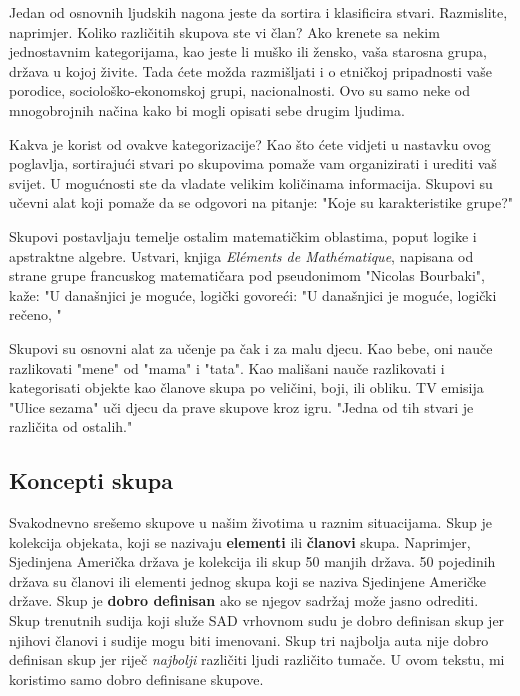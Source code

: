 \documentclass[a4paper,14pt,svgnames]{article}
\begin{document}
\bigskip\bigskip
\begin{Large}
Jedan od osnovnih ljudskih nagona jeste da sortira i klasificira stvari. Razmislite, naprimjer. Koliko različitih skupova ste vi član? Ako krenete sa nekim jednostavnim kategorijama, kao jeste li muško ili žensko, vaša starosna grupa, država u kojoj živite. Tada ćete možda razmišljati i o etničkoj pripadnosti vaše porodice, sociološko-ekonomskoj grupi, nacionalnosti. Ovo su samo neke od mnogobrojnih načina kako bi mogli opisati sebe drugim ljudima.

Kakva je korist od ovakve kategorizacije? Kao što ćete vidjeti u nastavku ovog poglavlja, sortirajući stvari po skupovima pomaže vam organizirati i urediti vaš svijet. U mogućnosti ste da vladate velikim količinama informacija. Skupovi su učevni alat koji pomaže da se odgovori na pitanje: "Koje su karakteristike grupe?"

Skupovi postavljaju temelje ostalim matematičkim oblastima, poput logike i apstraktne algebre. Ustvari, knjiga \textit{El\' ements de Math\' ematique}, napisana od strane grupe francuskog matematičara pod pseudonimom "Nicolas Bourbaki", kaže: "U današnjici je moguće, logički govoreći: "U današnjici je moguće, logički rečeno, "
\bigskip
\begin{tcolorbox}
Skupovi su osnovni alat za učenje pa čak i za malu djecu. Kao bebe, oni nauče razlikovati "mene" od "mama" i "tata". Kao mališani nauče razlikovati i kategorisati objekte kao članove skupa po veličini, boji, ili obliku. TV emisija "Ulice sezama" uči djecu da prave skupove kroz igru. "Jedna od tih stvari je različita od ostalih."
\end{tcolorbox}
\end{Large}
\newpage

\subsection{Koncepti skupa}

Svakodnevno srešemo skupove u našim životima u raznim situacijama. Skup je kolekcija objekata, koji se nazivaju \textbf{elementi} ili \textbf{članovi} skupa. Naprimjer, Sjedinjena Američka država je kolekcija ili skup 50 manjih država. 50 pojedinih država su članovi ili elementi jednog skupa koji se naziva Sjedinjene Američke države.
Skup je \textbf{dobro definisan} ako se njegov sadržaj može jasno odrediti. Skup trenutnih sudija koji služe SAD vrhovnom sudu je dobro definisan skup jer njihovi članovi i sudije mogu biti imenovani. Skup tri najbolja auta nije dobro definisan skup jer riječ \textit{najbolji} različiti ljudi različito tumače. U ovom tekstu, mi koristimo samo dobro definisane skupove.
\end{document}
